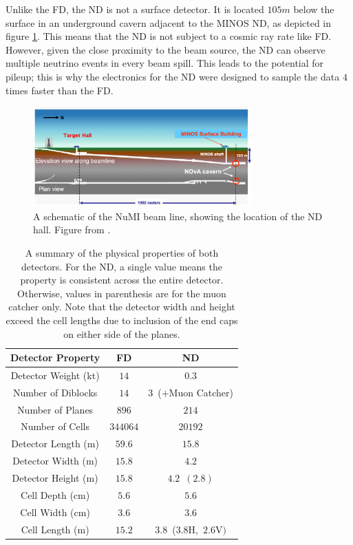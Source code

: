 Unlike the FD, the ND is not a surface detector. It is located $105\unit{m}$ below the surface in an underground cavern adjacent to the MINOS ND, as depicted in figure \ref{fig:DetNDPlan}. This means that the ND is not subject to a cosmic ray rate like FD. However, given the close proximity to the beam source, the ND can observe multiple neutrino events in every beam spill. This leads to the potential for pileup; this is why the electronics for the ND were designed to sample the data $4$ times faster than the FD.
\begin{figure}[htb]
  \centering
  \includegraphics[width=0.75\textwidth]{figures/DetNDPlan.png}
  \caption[Schematic of the NuMI Beam line]{A schematic of the NuMI beam line, showing the location of the ND hall. Figure from \cite{ref:TDRNOvA}.}
  \label{fig:DetNDPlan}
\end{figure}

\begin{table}[htb]
  \begin{center}
    \begin{tabular}{c c c}
      \hline\hline
      Detector Property & FD & ND \\
      \hline
      Detector Weight (kt) & $14$ & $0.3$ \\
      Number of Diblocks & $14$ & $3$~(${+}$Muon Catcher) \\
      Number of Planes & $896$ & $214$ \\
      Number of Cells & $344064$ & $20192$ \\
      Detector Length (m) & $59.6$ & $15.8$ \\
      Detector Width (m) & $15.8$ & $4.2$ \\
      Detector Height (m) & $15.8$ & $4.2$~$(2.8)$ \\
      Cell Depth (cm) & $5.6$ & $5.6$ \\
      Cell Width (cm) & $3.6$ & $3.6$ \\
      Cell Length (m) & $15.2$ & $3.8$~($3.8$H,~$2.6$V$)$ \\
      \hline
    \end{tabular}
    \caption[Detector Properties]{A summary of the physical properties of both detectors. For the ND, a single value means the property is consistent across the entire detector. Otherwise, values in parenthesis are for the muon catcher only. Note that the detector width and height exceed the cell lengths due to inclusion of the end caps on either side of the planes.}
    \label{tab:Dets}
  \end{center}
\end{table}